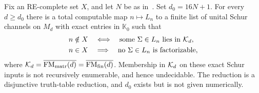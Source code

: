 \begin{theorem}\label{sw:fd-thm:fixed}
Fix an RE-complete set $X$, and let $N$ be as in~\cite[Thm.~7.2]{FMS}. Set $d_0=16N+1$. For every $d\ge d_0$ there is a total computable map $n\mapsto L_n$ to a finite list of unital Schur channels on $M_d$ with exact entries in $\mathbb K_0$ such that
\begin{align*}
n\notin X&\quad\Longleftrightarrow\quad
\text{some }\Sigma\in L_n\text{ lies in }\mathcal K_d,\\
n\in X&\quad\Longrightarrow\quad
\text{no }\Sigma\in L_n\text{ is factorizable},
\end{align*}
where $\mathcal K_d=\overline{\mathrm{FM}_{\rm matr}(d)}=\overline{\mathrm{FM}_{\rm fin}(d)}$. Membership in $\mathcal K_d$ on these exact Schur inputs is not recursively enumerable, and hence undecidable. The reduction is a disjunctive truth-table reduction, and $d_0$ exists but is not given numerically.
\end{theorem}
